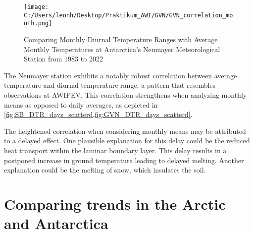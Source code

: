 \begin{figure}[h!]
    \centering
    \texttt{[image: C:/Users/leonh/Desktop/Praktikum\_AWI/GVN/GVN\_correlation\_month.png]}
    \caption{Comparing Monthly Diurnal Temperature Ranges with Average Monthly Temperatures at Antarctica's Neumayer Meteorological Station from 1983 to 2022}
    \label{fig:GVN_DTR_Month_scatterd}
\end{figure}



The Neumayer station exhibits a notably robust correlation between average temperature and diurnal temperature range, a pattern that resembles observations at AWIPEV. This correlation strengthens when analyzing monthly means as opposed to daily averages, as depicted in \cref{fig:SB_DTR_days_scatterd,fig:GVN_DTR_days_scatterd}.

The heightened correlation when considering monthly means may be attributed to a delayed effect. One plausible explanation for this delay could be the reduced heat transport within the laminar boundary layer. This delay results in a postponed increase in ground temperature leading to delayed melting. Another explanation could be the melting of snow, which insulates the soil.

\section{Comparing trends in the Arctic and Antarctica}

